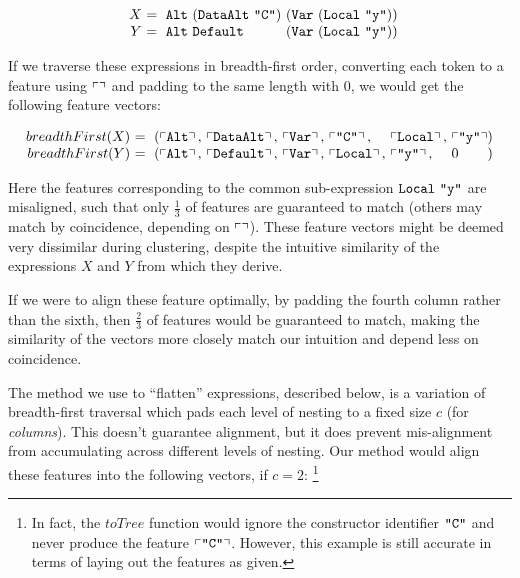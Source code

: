 \begin{equation*}
  \begin{array}{r@{}l@{}l@{}}
    X\ &=\ \CAlt\ (\CDataAlt\ \id{C})\ & (\vlocal{y}) \\
    Y\ &=\ \CAlt\ \CDefault\           & (\vlocal{y})
  \end{array}
\end{equation*}

If we traverse these expressions in breadth-first order, converting each token to a feature using $\left\ulcorner  \right\urcorner$ and padding to the same length with $0$, we would get the following feature vectors:

\begin{small}
  \begin{equation*}
    \begin{array}{r@{}l@{}l@{}l@{}l@{}l@{}l@{}l}
      breadthFirst(X)\ &=\ (\feature{\CAlt},\ &\feature{\CDataAlt},\ &\feature{\CVar},\ &\feature{\id{C}},\ &\feature{\CLocal},\ &\feature{\id{y}} &) \\
      breadthFirst(Y)\ &=\ (\feature{\CAlt},\ &\feature{\CDefault},\ &\feature{\CVar},\ &\feature{\CLocal},\ &\feature{\id{y}},\ &0 &)
    \end{array}
  \end{equation*}
\end{small}

Here the features corresponding to the common sub-expression $\texttt{Local}\ \texttt{"y"}$ are misaligned, such that only $\frac{1}{3}$ of features are guaranteed to match (others may match by coincidence, depending on $\left\ulcorner  \right\urcorner$). These feature vectors might be deemed very dissimilar during clustering, despite the intuitive similarity of the expressions $X$ and $Y$ from which they derive.

If we were to align these feature optimally, by padding the fourth column rather than the sixth, then $\frac{2}{3}$ of features would be guaranteed to match, making the similarity of the vectors more closely match our intuition and depend less on coincidence.

The method we use to ``flatten'' expressions, described below, is a variation of breadth-first traversal which pads each level of nesting to a fixed size $c$ (for \emph{columns}). This doesn't guarantee alignment, but it does prevent mis-alignment from accumulating across different levels of nesting. Our method would align these features into the following vectors, if $c = 2$: \footnote{In fact, the $toTree$ function would ignore the constructor identifier $\texttt{"C"}$ and never produce the feature $\left\ulcorner \texttt{"C"} \right\urcorner$. However, this example is still accurate in terms of laying out the features as given.}

